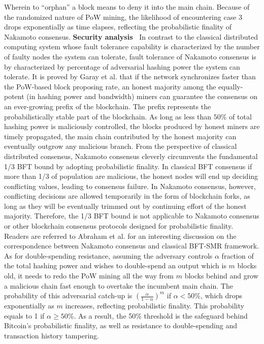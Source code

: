 Wherein to ``orphan'' a block means to deny it into the main chain. Because of the randomized nature of PoW mining, the likelihood of encountering case 3 drops exponentially as time elapses, reflecting the probabilistic finality of Nakamoto consensus.
\textbf{Security analysis~} In contrast to the classical distributed computing system whose fault tolerance capability is characterized by the number of faulty nodes the system can tolerate, fault tolerance of Nakamoto consensus is by characterized by percentage of adversarial hashing power the system can tolerate.
It is proved by Garay et al.  that if the network synchronizes faster than the PoW-based block proposing rate, an honest majority among the equally-potent (in hashing power and bandwidth) miners can guarantee the consensus on an ever-growing prefix of the blockchain. The prefix represents the probabilistically stable part of the blockchain.
As long as less than $50\%$ of total hashing power is maliciously controlled, the blocks produced by honest miners are timely propagated, the main chain contributed by the honest majority can eventually outgrow any malicious branch.
From the perspective of classical distributed consensus, Nakamoto consensus cleverly circumvents the fundamental 1/3 BFT bound by adopting probabilistic finality. In classical BFT consensus if more than 1/3 of population are malicious, the honest nodes will end up deciding conflicting values, leading to consensus failure. In Nakamoto consensus, however, conflicting decisions are allowed temporarily in the form of blockchain forks, as long as they will be eventually trimmed out by continuing effort of the honest majority. Therefore, the 1/3 BFT bound is not applicable to Nakamoto consensus or other blockchain consensus protocols designed for probabilistic finality.
{\color{\rcolor}
Readers are referred to Abraham et al.  for an interesting discussion on the correspondence between Nakamoto consensus and classical BFT-SMR framework.
}
As for double-spending resistance, assuming the adversary controls $\alpha$ fraction of the total hashing power and wishes to double-spend an output which is $m$ blocks old, it needs to redo the PoW mining all the way from $m$ blocks behind and grow a malicious chain fast enough to overtake the incumbent main chain. The probability of this adversarial catch-up is $(\frac{\alpha}{1-\alpha})^m$ if $\alpha<50\%$, which drops exponentially as $m$ increases, reflecting probabilistic finality. This probability equals to 1 if $\alpha\geq50\%$. As a result, the 50\% threshold is the safeguard behind Bitcoin's probabilistic finality, as well as resistance to double-spending and transaction history tampering.



